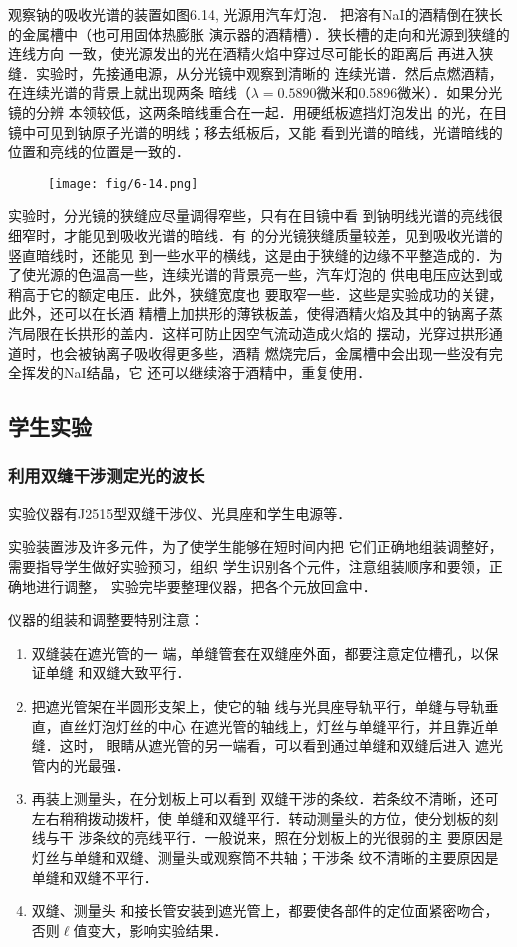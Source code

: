 观察钠的吸收光谱的装置如图6.14, 光源用汽车灯泡．
把溶有NaI的酒精倒在狭长的金属槽中（也可用固体热膨胀
演示器的酒精槽）．狭长槽的走向和光源到狭缝的连线方向
一致，使光源发出的光在酒精火焰中穿过尽可能长的距离后
再进入狭缝．实验时，先接通电源，从分光镜中观察到清晰的
连续光谱．然后点燃酒精，在连续光谱的背景上就出现两条
暗线（$\lambda=0.5890$微米和0.5896微米）．如果分光镜的分辨
本领较低，这两条暗线重合在一起．用硬纸板遮挡灯泡发出
的光，在目镜中可见到钠原子光谱的明线；移去纸板后，又能
看到光谱的暗线，光谱暗线的位置和亮线的位置是一致的．
\begin{figure}[htp]
    \centering
\texttt{[image: fig/6-14.png]}
    \caption{}
\end{figure}

实验时，分光镜的狭缝应尽量调得窄些，只有在目镜中看
到钠明线光谱的亮线很细窄时，才能见到吸收光谱的暗线．有
的分光镜狭缝质量较差，见到吸收光谱的竖直暗线时，还能见
到一些水平的横线，这是由于狭缝的边缘不平整造成的．为
了使光源的色温高一些，连续光谱的背景亮一些，汽车灯泡的
供电电压应达到或稍高于它的额定电压．此外，狭缝宽度也
要取窄一些．这些是实验成功的关键，此外，还可以在长酒
精槽上加拱形的薄铁板盖，使得酒精火焰及其中的钠离子蒸
汽局限在长拱形的盖内．这样可防止因空气流动造成火焰的
摆动，光穿过拱形通道时，也会被钠离子吸收得更多些，酒精
燃烧完后，金属槽中会出现一些没有完全挥发的NaI结晶，它
还可以继续溶于酒精中，重复使用．

\subsection{学生实验}
\subsubsection{利用双缝干涉测定光的波长}
实验仪器有J2515型双缝干涉仪、光具座和学生电源等．

实验装置涉及许多元件，为了使学生能够在短时间内把
它们正确地组装调整好，需要指导学生做好实验预习，组织
学生识别各个元件，注意组装顺序和要领，正确地进行调整，
实验完毕要整理仪器，把各个元放回盒中．

仪器的组装和调整要特别注意：
\begin{enumerate}
\item 双缝装在遮光管的一
端，单缝管套在双缝座外面，都要注意定位槽孔，以保证单缝
和双缝大致平行．    
\item 把遮光管架在半圆形支架上，使它的轴
线与光具座导轨平行，单缝与导轨垂直，直丝灯泡灯丝的中心
在遮光管的轴线上，灯丝与单缝平行，并且靠近单缝．这时，
眼睛从遮光管的另一端看，可以看到通过单缝和双缝后进入
遮光管内的光最强．    
\item 再装上测量头，在分划板上可以看到
双缝干涉的条纹．若条纹不清晰，还可左右稍稍拨动拨杆，使
单缝和双缝平行．转动测量头的方位，使分划板的刻线与干
涉条纹的亮线平行．一般说来，照在分划板上的光很弱的主
要原因是灯丝与单缝和双缝、测量头或观察筒不共轴；干涉条
纹不清晰的主要原因是单缝和双缝不平行．   
\item 双缝、测量头
和接长管安装到遮光管上，都要使各部件的定位面紧密吻合，
否则$\ell$值变大，影响实验结果．
\end{enumerate}

